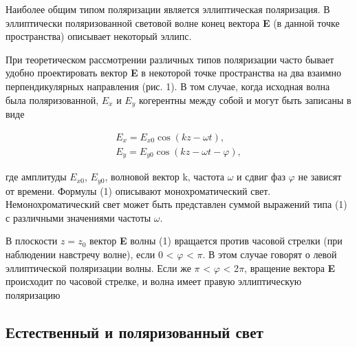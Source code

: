 \documentclass[a4paper,12pt]{article}
\begin{document}
Наиболее общим типом поляризации является эллиптическая поляризация. В эллиптически поляризованной световой волне конец вектора \textbf{E} (в данной точке пространства) описывает некоторый эллипс.

При теоретическом рассмотрении различных типов поляризации часто бывает удобно проектировать вектор \textbf{E} в некоторой точке пространства на два взаимно перпендикулярных направления (рис. 1). В том случае, когда исходная волна была поляризованной, $E_x$ и $E_y$ когерентны между собой и могут быть записаны в виде

\begin{equation}
\begin{gathered}
E_x = E_{x0} \cos(kz - \omega t), \\
E_y = E_{y0} \cos(kz - \omega t - \varphi),
\end{gathered}
\end{equation}

где амплитуды $E_{x0}$, $E_{y0}$, волновой вектор k,
частота $\omega$ и сдвиг фаз $\varphi$ не зависят от времени. Формулы (1) описывают монохроматический свет. Немонохроматический свет может быть представлен суммой выражений типа (1) с различными значениями частоты $\omega$.

В плоскости $z = z_0$ вектор \textbf{E} волны (1) вращается против часовой стрелки (при наблюдении навстречу волне), если 0 < $\varphi$ < $\pi$. В этом случае говорят о левой эллиптической поляризации волны. Если же $\pi$ < $\varphi$ < 2$\pi$, вращение вектора \textbf{E} происходит по часовой стрелке, и волна имеет правую эллиптическую поляризацию


\subsection*{Естественный и поляризованный свет}
\end{document}
